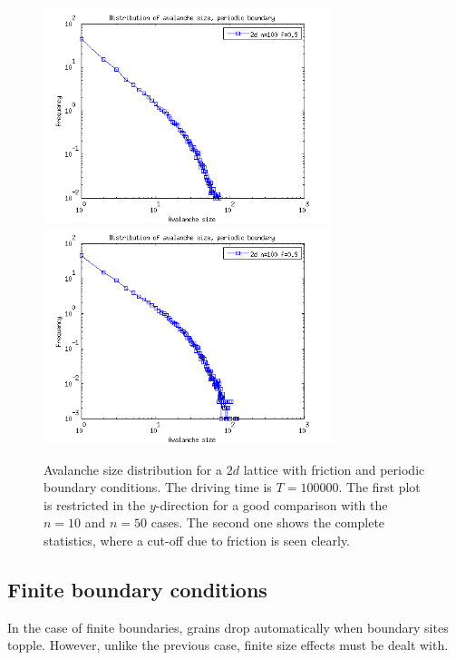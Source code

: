 \begin{figure} 
\begin{center}
\includegraphics[width=0.75\textwidth]{results/spf100.png} 
\includegraphics[width=0.75\textwidth]{results/spf100a.png}
\caption{Avalanche size distribution for a $2d$ lattice with friction and periodic boundary conditions. The driving time is $T=100 000$. The first plot is restricted in the $y$-direction for a good comparison with the $n=10$ and $n=50$ cases. The second one shows the complete statistics, where a cut-off due to friction is seen clearly. }
\label{spf2}
\end{center}
\end{figure} 




\subsection{Finite boundary conditions}

In the case of finite boundaries, grains drop automatically when boundary sites topple. However, unlike the previous case, finite size effects must be dealt with.

